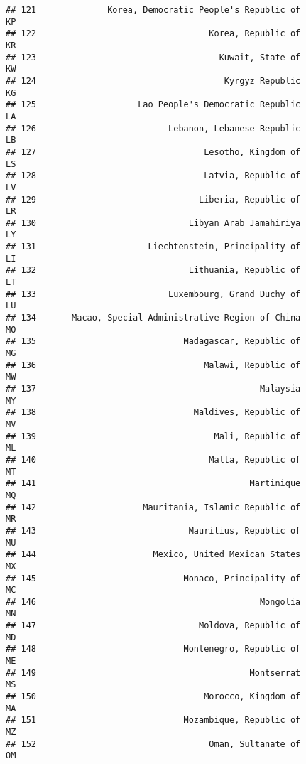 \documentclass[
]{article}
\begin{document}
\begin{verbatim}
## 121              Korea, Democratic People's Republic of                      KP
## 122                                  Korea, Republic of                      KR
## 123                                    Kuwait, State of                      KW
## 124                                     Kyrgyz Republic                      KG
## 125                    Lao People's Democratic Republic                      LA
## 126                          Lebanon, Lebanese Republic                      LB
## 127                                 Lesotho, Kingdom of                      LS
## 128                                 Latvia, Republic of                      LV
## 129                                Liberia, Republic of                      LR
## 130                              Libyan Arab Jamahiriya                      LY
## 131                      Liechtenstein, Principality of                      LI
## 132                              Lithuania, Republic of                      LT
## 133                          Luxembourg, Grand Duchy of                      LU
## 134       Macao, Special Administrative Region of China                      MO
## 135                             Madagascar, Republic of                      MG
## 136                                 Malawi, Republic of                      MW
## 137                                            Malaysia                      MY
## 138                               Maldives, Republic of                      MV
## 139                                   Mali, Republic of                      ML
## 140                                  Malta, Republic of                      MT
## 141                                          Martinique                      MQ
## 142                     Mauritania, Islamic Republic of                      MR
## 143                              Mauritius, Republic of                      MU
## 144                       Mexico, United Mexican States                      MX
## 145                             Monaco, Principality of                      MC
## 146                                            Mongolia                      MN
## 147                                Moldova, Republic of                      MD
## 148                             Montenegro, Republic of                      ME
## 149                                          Montserrat                      MS
## 150                                 Morocco, Kingdom of                      MA
## 151                             Mozambique, Republic of                      MZ
## 152                                  Oman, Sultanate of                      OM

\end{verbatim}
\end{document}
